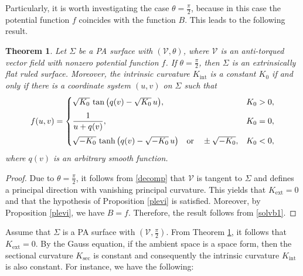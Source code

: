 \documentclass[12pt,reqno]{amsart}
\def\v{\mathcal V}
\newtheorem{theorem}{Theorem}[section]
\theoremstyle{definition}
\begin{document}
Particularly, it is worth investigating the case $\theta=\frac{\pi}{2}$, because in this case the potential function $f$ coincides with the function $B$. This leads to the following result.

\begin{theorem}\label{trightangle}
Let $\Sigma$ be a PA surface with $(\v,\theta)$, where $\v$ is an anti-torqued vector field with nonzero potential function $f$.  If $\theta=\frac{\pi}{2}$, then $\Sigma$ is an extrinsically flat ruled surface. Moreover, the intrinsic curvature $K_{\mathrm{int}}$ is a constant  $K_0$ if and only if there is a coordinate system $(u,v)$ on $\Sigma$ such that
\begin{equation}\label{solvf1}
f(u,v)=
\begin{cases}
\sqrt{K_0}\,\tan\big(q(v)-\sqrt{K_0}\,u\big), & K_0>0,\\[6pt]
\dfrac{1}{u+q(v)}, & K_0=0,\\[10pt]
\sqrt{-K_0}\,\tanh\big(q(v)-\sqrt{-K_0}\,u\big) \quad \textnormal{or} \quad
\pm\sqrt{-K_0},  & K_0<0,
\end{cases}
\end{equation}
where $q(v)$ is an arbitrary smooth function.
\end{theorem}

\begin{proof}
Due to $\theta=\frac{\pi}{2}$, it follows from \eqref{decomp} that $\v$ is tangent to $\Sigma$ and defines a principal direction with vanishing principal curvature. This yields that $K_{\mathrm{ext}}=0$ and that the hypothesis of Proposition \ref{plevi} is satisfied.  Moreover, by Proposition \ref{plevi}, we have $B=f$. Therefore, the result follows from \eqref{solvb1}.
\end{proof}

Assume that $\Sigma$ is a PA surface with $(\v,\frac{\pi}{2})$. From Theorem \ref{trightangle}, it follows that $K_{\mathrm{ext}}=0$. By the Gauss equation, if the ambient space is a space form, then the sectional curvature $K_{\mathrm{sec}}$ is constant and consequently the intrinsic curvature $K_{\mathrm{int}}$ is also constant. For instance, we have the following:
\end{document}
